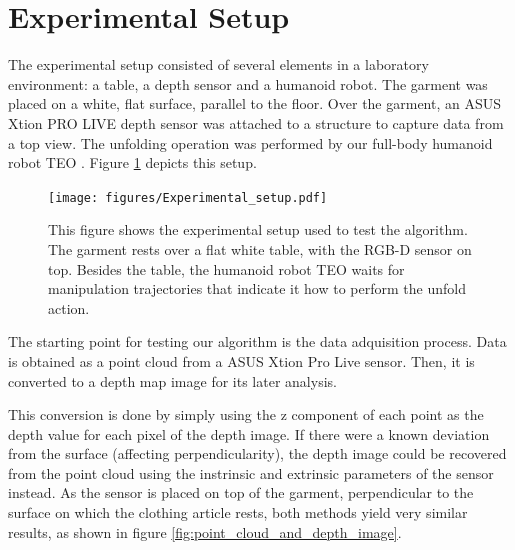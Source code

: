 \section{Experimental Setup}
\label{experiments:expermimental_setup}

The experimental setup consisted of several elements in a laboratory environment: a table, a depth sensor and a humanoid robot. The garment was placed on a white, flat surface, parallel to the floor. Over the garment, an ASUS Xtion PRO LIVE depth sensor was attached to a structure to capture data from a top view. The unfolding operation was performed by our full-body humanoid robot TEO \cite{martinez2012teo}. Figure \ref{fig:experimental_setup} depicts this setup.

\begin{figure}[t]
    \centering
    \texttt{[image: figures/Experimental\_setup.pdf]}
    \caption{This figure shows the experimental setup used to test the algorithm. The garment rests over a flat white table, with the RGB-D sensor on top. Besides the table, the humanoid robot TEO waits for manipulation trajectories that indicate it how to perform the unfold action.}
    \label{fig:experimental_setup}
\end{figure}

The starting point for testing our algorithm is the data adquisition process. Data is obtained as a point cloud from a ASUS Xtion Pro Live sensor. Then, it is converted to a depth map image for its later analysis. 

This conversion is done by simply using the z component of each point as the depth value for each pixel of the depth image. If there were a known deviation from the surface (affecting perpendicularity), the depth image could be recovered from the point cloud using the instrinsic and extrinsic parameters of the sensor instead. As the sensor is placed on top of the garment, perpendicular to the surface on which the clothing article rests, both methods yield very similar results, as shown in figure \ref{fig:point_cloud_and_depth_image}.


